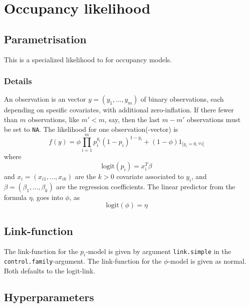 \documentclass[a4paper,11pt]{article}
\begin{document}
\section*{Occupancy likelihood}

\subsection*{Parametrisation}

This is a specialized likelihood to for occupancy models.

\subsubsection*{Details}

An observation is an vector $y=(y_1, \ldots, y_m)$ of binary
observations, each depending on spesific covariates, with additional
zero-inflation. If there fewer than $m$ observations, like $m' < m$,
say, then the last $m-m'$ observations must be set to \texttt{NA}.
The likelihood for one observation(-vector) is
\begin{displaymath}
    f(y) = \phi \prod_{i=1}^{m} p_i^{y_i} (1-p_i)^{1-y_i} + (1-\phi)
    1_{\text{[$y_i=0, \forall i$]}}
\end{displaymath}
where 
\begin{displaymath}
    \text{logit}(p_i) = x_i^{T} \beta
\end{displaymath}
and $x_i= (x_{i1}, \ldots, x_{ik})$ are the $k>0$ covariate associated
to $y_i$, and $\beta=(\beta_1, \ldots, \beta_k)$ are the regression
coefficients. The linear predictor from the formula $\eta$, goes into
$\phi$, as
\begin{displaymath}
    \text{logit}(\phi) = \eta
\end{displaymath}

\subsection*{Link-function}

The link-function for the $p_i$-model is given by argument
\texttt{link.simple} in the \texttt{control.family}-argument. The
link-function for the $\phi$-model is given as normal. Both defaults
to the logit-link.

\subsection*{Hyperparameters}
\end{document}
